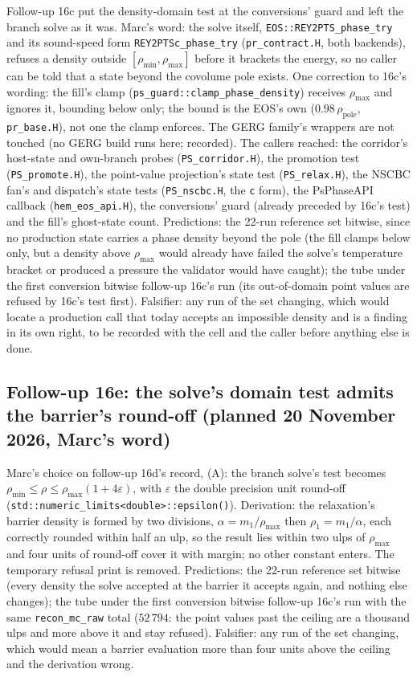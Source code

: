 \documentclass[11pt,a4paper]{article}
\newcommand{\code}[1]{\texttt{\small #1}}
\begin{document}
Follow-up 16c put the density-domain test at the conversions' guard
and left the branch solve as it was.  Marc's word: the solve itself,
\code{EOS::REY2PTS\_phase\_try} and its sound-speed form
\code{REY2PTSc\_phase\_try} (\code{pr\_contract.H}, both backends),
refuses a density outside $[\rho_{\min}, \rho_{\max}]$ before it
brackets the energy, so no caller can be told that a state beyond the
covolume pole exists.  One correction to 16c's wording: the fill's
clamp (\code{ps\_guard::clamp\_phase\_density}) receives
$\rho_{\max}$ and ignores it, bounding below only; the bound is the
EOS's own ($0.98\,\rho_{\mathrm{pole}}$, \code{pr\_base.H}), not one the
clamp enforces.  The GERG family's wrappers are not touched (no GERG
build runs here; recorded).  The callers reached: the corridor's
host-state and own-branch probes (\code{PS\_corridor.H}), the promotion
test (\code{PS\_promote.H}), the point-value projection's state test
(\code{PS\_relax.H}), the NSCBC fan's and dispatch's state tests
(\code{PS\_nscbc.H}, the \code{c} form), the PsPhaseAPI callback
(\code{hem\_eos\_api.H}), the conversions' guard (already preceded by
16c's test) and the fill's ghost-state count.  Predictions: the 22-run
reference set bitwise, since no production state carries a phase
density beyond the pole (the fill clamps below only, but a density
above $\rho_{\max}$ would already have failed the solve's temperature
bracket or produced a pressure the validator would have caught); the
tube under the first conversion bitwise follow-up 16c's run (its
out-of-domain point values are refused by 16c's test first).
Falsifier: any run of the set changing, which would locate a production
call that today accepts an impossible density and is a finding in its
own right, to be recorded with the cell and the caller before anything
else is done.

\subsection*{Follow-up 16e: the solve's domain test admits the barrier's round-off (planned 20 November 2026, Marc's word)}

Marc's choice on follow-up 16d's record, (A): the branch solve's test
becomes $\rho_{\min} \le \rho \le \rho_{\max}(1 + 4\varepsilon)$, with
$\varepsilon$ the double precision unit round-off
(\code{std::numeric\_limits<double>::epsilon()}).  Derivation: the
relaxation's barrier density is formed by two divisions,
$\alpha = m_1/\rho_{\max}$ then $\rho_1 = m_1/\alpha$, each correctly
rounded within half an ulp, so the result lies within two ulps of
$\rho_{\max}$ and four units of round-off cover it with margin; no other
constant enters.  The temporary refusal print is removed.  Predictions:
the 22-run reference set bitwise (every density the solve accepted at
the barrier it accepts again, and nothing else changes); the tube under
the first conversion bitwise follow-up 16c's run with the same
\code{recon\_mc\_raw} total ($52\,794$: the point values past the
ceiling are a thousand ulps and more above it and stay refused).
Falsifier: any run of the set changing, which would mean a barrier
evaluation more than four units above the ceiling and the derivation
wrong.
\end{document}
